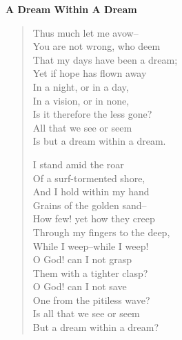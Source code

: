 \documentclass[12pt]{report}
\begin{document}
\itshape

{\Large\bfseries A Dream Within A Dream}

\begin{verse}
Thus much let me avow-- \\
You are not wrong, who deem \\
That my days have been a dream; \\
Yet if hope has flown away \\
In a night, or in a day, \\
In a vision, or in none, \\
Is it therefore the less gone? \\
All that we see or seem \\
Is but a dream within a dream.

I stand amid the roar \\
Of a surf-tormented shore, \\
And I hold within my hand \\
Grains of the golden sand-- \\
How few! yet how they creep \\
Through my fingers to the deep, \\
While I weep--while I weep! \\
O God! can I not grasp \\
Them with a tighter clasp? \\
O God! can I not save \\
One from the pitiless wave? \\
Is all that we see or seem \\
But a dream within a dream?

\end{verse}
\end{document}
